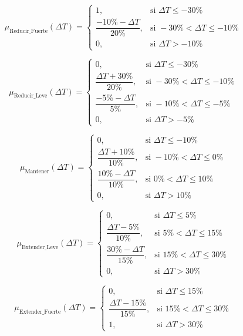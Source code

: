 \documentclass[12pt,a4paper,oneside]{report}
\begin{document}
\begin{equation}
\mu_{\text{Reducir\_Fuerte}}(\Delta T) =
\begin{cases}
1, & \text{si } \Delta T \leq -30\%\\[3pt]
\dfrac{-10\% - \Delta T}{20\%}, & \text{si } -30\% < \Delta T \leq -10\%\\[6pt]
0, & \text{si } \Delta T > -10\%
\end{cases}
\end{equation}

\begin{equation}
\mu_{\text{Reducir\_Leve}}(\Delta T) =
\begin{cases}
0, & \text{si } \Delta T \leq -30\%\\[3pt]
\dfrac{\Delta T + 30\%}{20\%}, & \text{si } -30\% < \Delta T \leq -10\%\\[6pt]
\dfrac{-5\% - \Delta T}{5\%}, & \text{si } -10\% < \Delta T \leq -5\%\\[6pt]
0, & \text{si } \Delta T > -5\%
\end{cases}
\end{equation}

\begin{equation}
\mu_{\text{Mantener}}(\Delta T) =
\begin{cases}
0, & \text{si } \Delta T \leq -10\%\\[3pt]
\dfrac{\Delta T + 10\%}{10\%}, & \text{si } -10\% < \Delta T \leq 0\%\\[6pt]
\dfrac{10\% - \Delta T}{10\%}, & \text{si } 0\% < \Delta T \leq 10\%\\[6pt]
0, & \text{si } \Delta T > 10\%
\end{cases}
\end{equation}

\begin{equation}
\mu_{\text{Extender\_Leve}}(\Delta T) =
\begin{cases}
0, & \text{si } \Delta T \leq 5\%\\[3pt]
\dfrac{\Delta T - 5\%}{10\%}, & \text{si } 5\% < \Delta T \leq 15\%\\[6pt]
\dfrac{30\% - \Delta T}{15\%}, & \text{si } 15\% < \Delta T \leq 30\%\\[6pt]
0, & \text{si } \Delta T > 30\%
\end{cases}
\end{equation}

\begin{equation}
\mu_{\text{Extender\_Fuerte}}(\Delta T) =
\begin{cases}
0, & \text{si } \Delta T \leq 15\%\\[3pt]
\dfrac{\Delta T - 15\%}{15\%}, & \text{si } 15\% < \Delta T \leq 30\%\\[6pt]
1, & \text{si } \Delta T > 30\%
\end{cases}
\end{equation}
\end{document}
